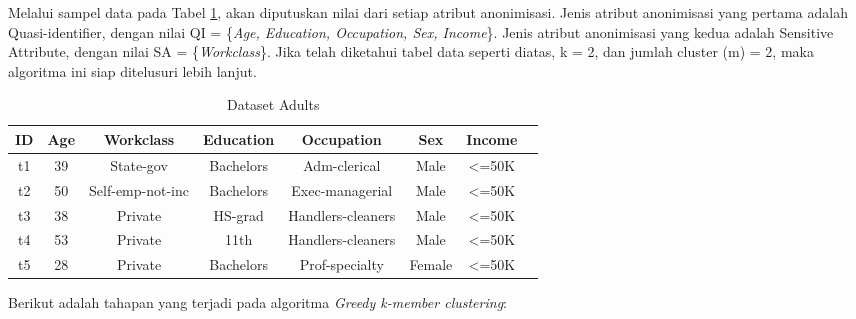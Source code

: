\par Melalui sampel data pada Tabel \ref{table:adults}, akan diputuskan nilai dari setiap atribut anonimisasi. Jenis atribut anonimisasi yang pertama adalah Quasi-identifier, dengan nilai QI = \{\textit{Age, Education, Occupation, Sex, Income}\}. Jenis atribut anonimisasi yang kedua adalah Sensitive Attribute, dengan nilai SA = \{\textit{Workclass}\}. Jika telah diketahui tabel data seperti diatas, k = 2, dan jumlah cluster (m) = 2, maka algoritma ini siap ditelusuri lebih lanjut.

\begin{table}[H]
\centering
\caption{Dataset Adults}
\begin{tabular}{c c c c c c c c}
\hline 
ID & Age & Workclass & Education & Occupation & Sex & Income\\ 
\hline 
t1 & 39 & State-gov & Bachelors & Adm-clerical & Male & <=50K \\ 

t2 & 50 & Self-emp-not-inc & Bachelors & Exec-managerial & Male & <=50K  \\ 

t3 & 38 & Private & HS-grad & Handlers-cleaners & Male & <=50K  \\ 

t4 & 53 & Private & 11th & Handlers-cleaners & Male & <=50K  \\ 
 
t5 & 28 & Private & Bachelors & Prof-specialty & Female & <=50K	 \\ 
\hline 
\end{tabular} 
\label{table:adults}
\end{table}

\noindent Berikut adalah tahapan yang terjadi pada algoritma \textit{Greedy k-member clustering}:

